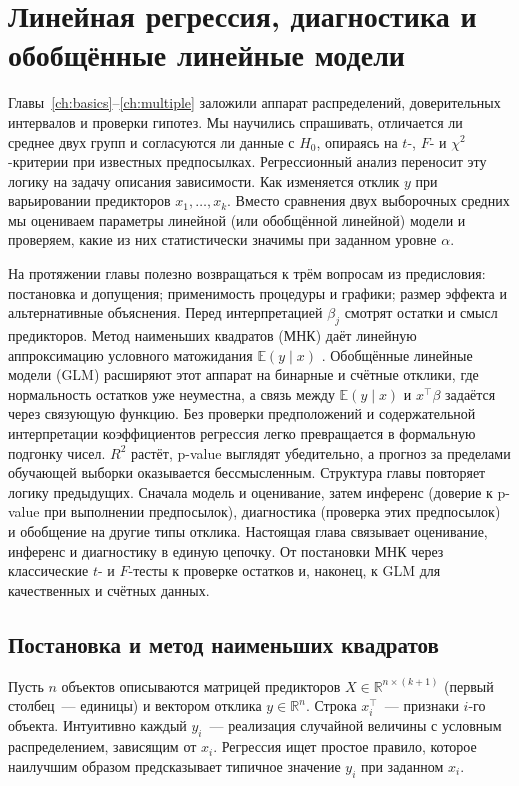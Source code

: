 \chapter{Линейная регрессия, диагностика и обобщённые линейные модели}
\label{ch:regression}

Главы~\ref{ch:basics}--\ref{ch:multiple} заложили аппарат распределений, доверительных интервалов и проверки гипотез. Мы научились спрашивать, отличается ли среднее двух групп и согласуются ли данные с $H_0$, опираясь на $t$-, $F$- и $\chi^2$-критерии при известных предпосылках.
Регрессионный анализ переносит эту логику на задачу описания зависимости. Как изменяется отклик $y$ при варьировании предикторов $x_1,\ldots,x_k$.
Вместо сравнения двух выборочных средних мы оцениваем параметры линейной (или обобщённой линейной) модели и проверяем, какие из них статистически значимы при заданном уровне $\alpha$.


На протяжении главы полезно возвращаться к трём вопросам из предисловия: постановка и допущения; применимость процедуры и графики; размер эффекта и альтернативные объяснения. Перед интерпретацией $\beta_j$ смотрят остатки и смысл предикторов. 
Метод наименьших квадратов (МНК) даёт линейную аппроксимацию условного матожидания $\mathbb{E}(y\mid x)$ \citep{casella2002}. Обобщённые линейные модели (GLM) расширяют этот аппарат на бинарные и счётные отклики, где нормальность остатков уже неуместна, а связь между $\mathbb{E}(y\mid x)$ и $x^\top\beta$ задаётся через связующую функцию.
Без проверки предположений и содержательной интерпретации коэффициентов регрессия легко превращается в формальную подгонку чисел. $R^2$ растёт, p-value выглядят убедительно, а прогноз за пределами обучающей выборки оказывается бессмысленным.
Структура главы повторяет логику предыдущих. Сначала модель и оценивание, затем инференс (доверие к p-value при выполнении предпосылок), диагностика (проверка этих предпосылок) и обобщение на другие типы отклика.
Настоящая глава связывает оценивание, инференс и диагностику в единую цепочку. От постановки МНК через классические $t$- и $F$-тесты к проверке остатков и, наконец, к GLM для качественных и счётных данных.

\section{Постановка и метод наименьших квадратов}

Пусть $n$ объектов описываются матрицей предикторов $X\in\mathbb{R}^{n\times(k+1)}$ (первый столбец~--- единицы) и вектором отклика $y\in\mathbb{R}^n$.
Строка $x_i^\top$~--- признаки $i$-го объекта.
Интуитивно каждый $y_i$~--- реализация случайной величины с условным распределением, зависящим от $x_i$. Регрессия ищет простое правило, которое наилучшим образом предсказывает типичное значение $y_i$ при заданном $x_i$.

